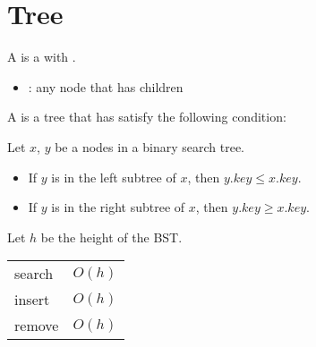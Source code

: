 \chapter{Tree}

    \par A  is a  with .
    \begin{itemize}
      \item {}: any node that has children
    \end{itemize}


    \par A  is a tree that has satisfy the
      following condition:
    \par Let $x$, $y$ be a nodes in a binary search tree. 
      \begin{itemize}
        \item If $y$ is in the left subtree of $x$, then $y.key \leq x.key$.
        \item If $y$ is in the right subtree of $x$, then $y.key \geq x.key$.
      \end{itemize}
    \par Let $h$ be the height of the BST.
      \begin{center}
        \begin{tabular}{|l|l|}
        \hline
               &        \\ \hline
        search & $O(h)$ \\ \hline
        insert & $O(h)$ \\ \hline
        remove & $O(h)$ \\ \hline
        \end{tabular}
      \end{center}


